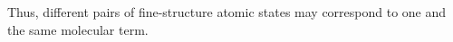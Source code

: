 Thus, different pairs of fine-structure atomic states may correspond to one and the same molecular term.
